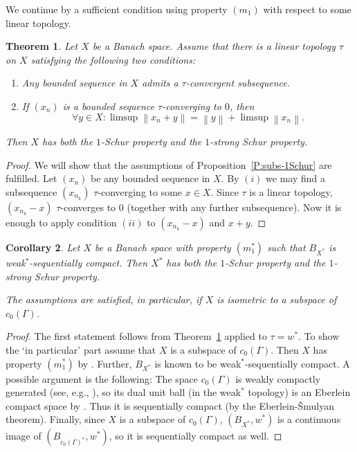 \documentclass{amsart}
\numberwithin{equation}{section}
\newtheorem{thm}{Theorem}[section]
\newtheorem{cor}[thm]{Corollary}
\theoremstyle{definition}
\newcommand{\norm}[1]{\left\|#1\right\|}
\begin{document}
We continue by a sufficient condition using property $(m_1)$ with respect to some linear topology.

     \begin{thm}\label{T:m1-tau}
         Let $X$ be a Banach space. Assume that there is a linear topology $\tau$ on $X$ satisfying the following two conditions:
         \begin{enumerate}[$(i)$]
             \item Any bounded sequence in $X$ admits a $\tau$-convergent subsequence.
             \item If $(x_n)$ is a bounded sequence $\tau$-converging to $0$, then
             $$\forall y\in X\colon \limsup\norm{x_n+y}=\norm{y}+\limsup\norm{x_n}.$$
         \end{enumerate}
         Then $X$ has both the $1$-Schur property and the $1$-strong Schur property.
     \end{thm}
    
   \begin{proof}
       We will show that the assumptions of Proposition~\ref{P:subs-1Schur} are fulfilled. Let $(x_n)$ be any bounded sequence in $X$. By $(i)$ we may find a subsequence $(x_{n_k})$ $\tau$-converging to some $x\in X$. Since $\tau$ is a linear topology, $(x_{n_k}-x)$ $\tau$-converges to $0$ (together with any further subsequence). Now it is enough to apply condition $(ii)$ to $(x_{n_k}-x)$ and $x+y$.
   \end{proof}


\begin{cor}
    Let $X$ be a Banach space with property $(m_1^*)$ such that $B_{X^*}$ is weak$^*$-sequentially compact.
    Then $X^*$ has both the $1$-Schur property and the $1$-strong Schur property. 

    The assumptions are satisfied, in particular, if $X$ is isometric to a subspace of $c_0(\Gamma)$.
\end{cor}

\begin{proof}
    The first statement follows from Theorem~\ref{T:m1-tau} applied to $\tau=w^*$. To show the `in particular' part assume that $X$ is a subspace of $c_0(\Gamma)$. Then $X$ has property $(m_1^*)$ by \cite[Lemma 1.2]{qschur-dp}. Further, $B_{X^*}$ is known to be weak$^*$-sequentially compact. A possible argument is the following:
    The space $c_0(\Gamma)$ is weakly compactly generated (see, e.g., \cite[Example (iii) on p. 575]{fhhmpz}), so its dual unit ball (in the weak$^*$ topology) is an Eberlein compact space by \cite[Theorem 13.20]{fhhmpz}. Thus it is sequentially compact (by the Eberlein-\v{S}mulyan theorem). Finally, since $X$ is a subspace of $c_0(\Gamma)$, $(B_{X^*},w^*)$ is a continuous image of $(B_{c_0(\Gamma)^*},w^*)$, so it is sequentially compact as well.
\end{proof}
\end{document}
